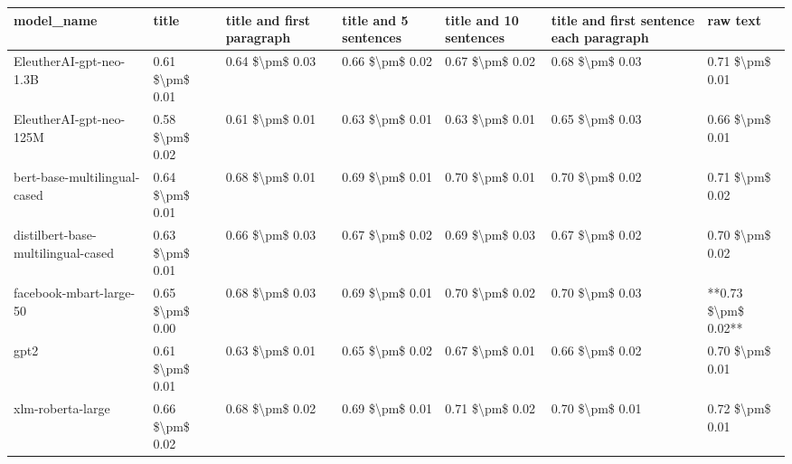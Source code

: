 \begin{tabular}{lllllll}
\toprule
                        model\_name &           title & title and first paragraph & title and 5 sentences & title and 10 sentences & title and first sentence each paragraph &            raw text \\
\midrule
           EleutherAI-gpt-neo-1.3B & 0.61 \$\textbackslash pm\$ 0.01 &           0.64 \$\textbackslash pm\$ 0.03 &       0.66 \$\textbackslash pm\$ 0.02 &        0.67 \$\textbackslash pm\$ 0.02 &                         0.68 \$\textbackslash pm\$ 0.03 &     0.71 \$\textbackslash pm\$ 0.01 \\
           EleutherAI-gpt-neo-125M & 0.58 \$\textbackslash pm\$ 0.02 &           0.61 \$\textbackslash pm\$ 0.01 &       0.63 \$\textbackslash pm\$ 0.01 &        0.63 \$\textbackslash pm\$ 0.01 &                         0.65 \$\textbackslash pm\$ 0.03 &     0.66 \$\textbackslash pm\$ 0.01 \\
      bert-base-multilingual-cased & 0.64 \$\textbackslash pm\$ 0.01 &           0.68 \$\textbackslash pm\$ 0.01 &       0.69 \$\textbackslash pm\$ 0.01 &        0.70 \$\textbackslash pm\$ 0.01 &                         0.70 \$\textbackslash pm\$ 0.02 &     0.71 \$\textbackslash pm\$ 0.02 \\
distilbert-base-multilingual-cased & 0.63 \$\textbackslash pm\$ 0.01 &           0.66 \$\textbackslash pm\$ 0.03 &       0.67 \$\textbackslash pm\$ 0.02 &        0.69 \$\textbackslash pm\$ 0.03 &                         0.67 \$\textbackslash pm\$ 0.02 &     0.70 \$\textbackslash pm\$ 0.02 \\
           facebook-mbart-large-50 & 0.65 \$\textbackslash pm\$ 0.00 &           0.68 \$\textbackslash pm\$ 0.03 &       0.69 \$\textbackslash pm\$ 0.01 &        0.70 \$\textbackslash pm\$ 0.02 &                         0.70 \$\textbackslash pm\$ 0.03 & **0.73 \$\textbackslash pm\$ 0.02** \\
                              gpt2 & 0.61 \$\textbackslash pm\$ 0.01 &           0.63 \$\textbackslash pm\$ 0.01 &       0.65 \$\textbackslash pm\$ 0.02 &        0.67 \$\textbackslash pm\$ 0.01 &                         0.66 \$\textbackslash pm\$ 0.02 &     0.70 \$\textbackslash pm\$ 0.01 \\
                 xlm-roberta-large & 0.66 \$\textbackslash pm\$ 0.02 &           0.68 \$\textbackslash pm\$ 0.02 &       0.69 \$\textbackslash pm\$ 0.01 &        0.71 \$\textbackslash pm\$ 0.02 &                         0.70 \$\textbackslash pm\$ 0.01 &     0.72 \$\textbackslash pm\$ 0.01 \\
\bottomrule
\end{tabular}
